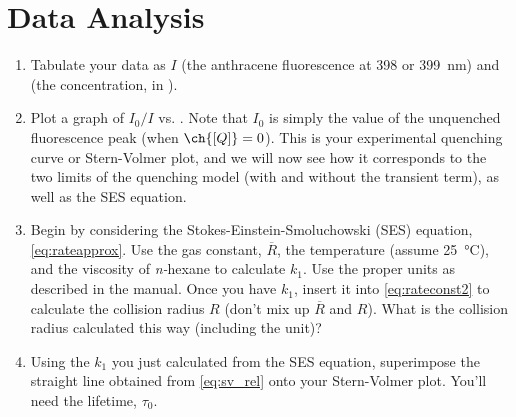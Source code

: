 \section{Data Analysis} %
\label{sec:data_analysis}
\begin{enumerate}
	\item Tabulate your data as \( I \) (the anthracene fluorescence at \num{398} or \qty{399}{\nm}) and \ch{[Q]} (the  concentration, in \unit{\Molar}).
	\item Plot a graph of  \( I_0/I \)  vs. \ch{[Q]}. 
	Note that \( I_0 \) is simply the value of the unquenched fluorescence peak (when \( \ch{[Q]} = 0 \)). 
	This is your experimental quenching curve or Stern-Volmer plot, and we will now see how it corresponds to the two limits of the quenching model (with and without the transient term), as well as the SES equation.
	\item Begin by considering the Stokes-Einstein-Smoluchowski (SES) equation, \cref{eq:rateapprox}. 
	Use the gas constant, \( \overline{R} \), the temperature (assume \qty{25}{\celsius}), and the viscosity of \emph{n-}hexane to calculate \( k_1 \). 
	Use the proper units as described in the manual. 
	Once you have \( k_1 \), insert it into \cref{eq:rateconst2} to calculate the collision radius \( R \) (don’t mix up \( \overline{R} \) and \( R \)). 
	What is the collision radius calculated this way (including the unit)?
	\item Using the \( k_1 \) you just calculated from the SES equation, superimpose the straight line obtained from \cref{eq:sv_rel} onto your Stern-Volmer plot. You’ll need the lifetime, \( \tau_0 \).

\end{enumerate}
